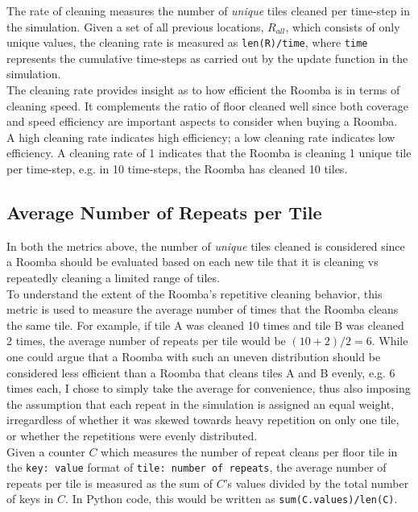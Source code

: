 \documentclass[11pt]{article}
\begin{document}
The rate of cleaning measures the number of \emph{unique} tiles cleaned
per time-step in the simulation. Given a set of all previous locations,
\(R_{all}\), which consists of only unique values, the cleaning rate is
measured as \texttt{len(R)/time}, where \texttt{time} represents the
cumulative time-steps as carried out by the update function in the
simulation.\\

The cleaning rate provides insight as to how efficient the Roomba is in
terms of cleaning speed. It complements the ratio of floor cleaned well
since both coverage and speed efficiency are important aspects to
consider when buying a Roomba.\\

A high cleaning rate indicates high efficiency; a low cleaning rate
indicates low efficiency. A cleaning rate of 1 indicates that the Roomba
is cleaning 1 unique tile per time-step, e.g. in 10 time-steps, the
Roomba has cleaned 10 tiles.
\newpage
\subsection{Average Number of Repeats per Tile}

In both the metrics above, the number of \emph{unique} tiles cleaned is
considered since a Roomba should be evaluated based on each new tile
that it is cleaning vs repeatedly cleaning a limited range of tiles.\\

To understand the extent of the Roomba's repetitive cleaning behavior,
this metric is used to measure the average number of times that the
Roomba cleans the same tile. For example, if tile A was cleaned 10 times
and tile B was cleaned 2 times, the average number of repeats per tile
would be \((10 + 2)/2 = 6\). While one could argue that a Roomba with
such an uneven distribution should be considered less efficient than a
Roomba that cleans tiles A and B evenly, e.g. \(6\) times each, I chose
to simply take the average for convenience, thus also imposing the
assumption that each repeat in the simulation is assigned an equal
weight, irregardless of whether it was skewed towards heavy repetition
on only one tile, or whether the repetitions were evenly distributed.\\

Given a counter \(C\) which measures the number of repeat cleans per
floor tile in the \texttt{key:\ value} format of
\texttt{tile:\ number\ of\ repeats}, the average number of repeats per
tile is measured as the sum of \(C\)'s values divided by the total
number of keys in \(C\). In Python code, this would be written as
\texttt{sum(C.values)/len(C)}.\\
\end{document}
